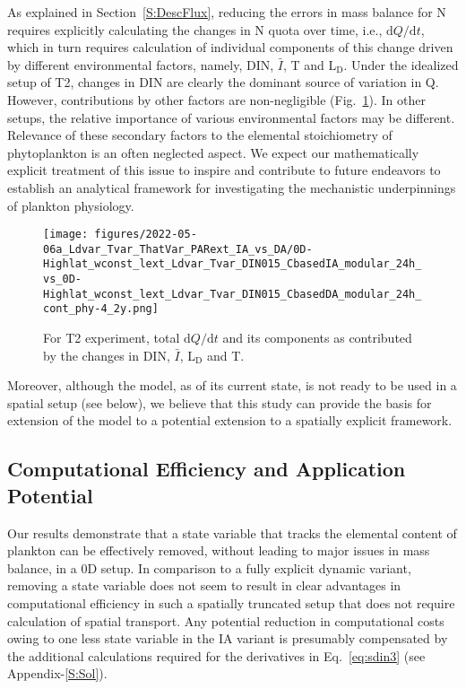 \documentclass[gmd, manuscript]{copernicus}
\newcommand{\onur}[1]{\textcolor{blue}{\{Onur: #1\}}}
\begin{document}
As explained in Section~\ref{S:DescFlux}, reducing the errors in mass balance for N requires explicitly calculating the changes in N quota over time, i.e., $\textrm{d}Q/\textrm{d}t$, which in turn requires calculation of individual components of this change driven by different environmental factors, namely, DIN, $\bar{I}$, T and $\textrm{L}_{\textrm{D}}$.  Under the idealized setup of T2, changes in DIN are clearly the dominant source of variation in Q.  However, contributions by other factors are non-negligible (Fig.~\ref{f.T2dQdt}). In other setups, the relative importance of various environmental factors may be different. Relevance of these secondary factors to the elemental stoichiometry of phytoplankton is an often neglected aspect. We expect our mathematically explicit treatment of this issue to inspire and contribute to future endeavors to establish an analytical framework for investigating the mechanistic underpinnings of plankton physiology.

\begin{figure}[ht!]
\texttt{[image: figures/2022-05-06a\_Ldvar\_Tvar\_ThatVar\_PARext\_IA\_vs\_DA/0D-Highlat\_wconst\_lext\_Ldvar\_Tvar\_DIN015\_CbasedIA\_modular\_24h\_vs\_0D-Highlat\_wconst\_lext\_Ldvar\_Tvar\_DIN015\_CbasedDA\_modular\_24h\_cont\_phy-4\_2y.png]}
\caption{For T2 experiment, total $\textrm{d}Q/\textrm{d}t$ and its components as contributed by the changes in DIN, $\bar{I}$, $\textrm{L}_{\textrm{D}}$ and T.\label{f.T2dQdt}}
\end{figure}

 Moreover, although the model, as of its current state, is not ready to be used in a spatial setup (see below), we believe that this study can provide the basis for extension of the model to a potential extension to a spatially explicit framework.

\FloatBarrier
\subsection{Computational Efficiency and Application Potential}

Our results demonstrate that a state variable that tracks the elemental content of plankton can be effectively removed, without leading to major issues in mass balance, in a 0D setup. In comparison to a fully explicit dynamic variant, removing a state variable does not seem to result in clear advantages in computational efficiency in such a spatially truncated setup that does not require calculation of spatial transport.
Any potential reduction in computational costs owing to one less state variable in the IA variant is presumably compensated by the additional calculations required for the derivatives in Eq.~\ref{eq:sdin3} (see Appendix-\ref{S:Sol}). 
\end{document}
